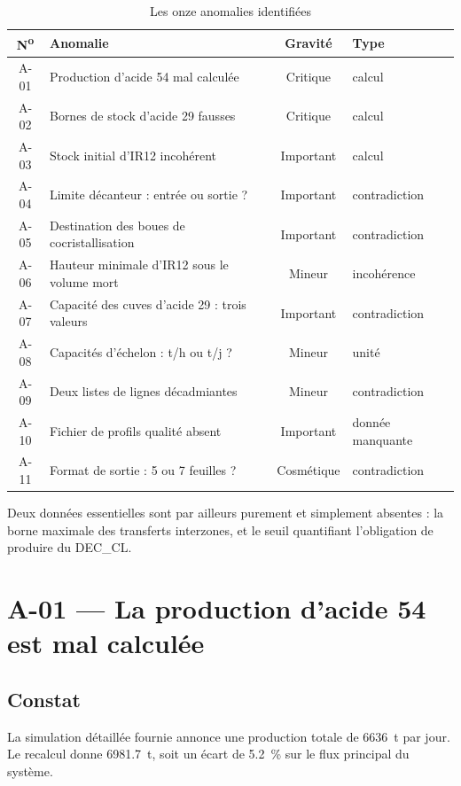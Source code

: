\begin{table}[H]
\centering
\caption{Les onze anomalies identifiées}
\label{tab:anomalies}
\begin{tabular}{@{}clcl@{}}
\toprule
\textbf{N\textsuperscript{o}} & \textbf{Anomalie} & \textbf{Gravité} & \textbf{Type} \\
\midrule
A-01 & Production d'acide 54 mal calculée & Critique & calcul \\
A-02 & Bornes de stock d'acide 29 fausses & Critique & calcul \\
A-03 & Stock initial d'IR12 incohérent & Important & calcul \\
A-04 & Limite décanteur : entrée ou sortie ? & Important & contradiction \\
A-05 & Destination des boues de cocristallisation & Important & contradiction \\
A-06 & Hauteur minimale d'IR12 sous le volume mort & Mineur & incohérence \\
A-07 & Capacité des cuves d'acide 29 : trois valeurs & Important & contradiction \\
A-08 & Capacités d'échelon : t/h ou t/j ? & Mineur & unité \\
A-09 & Deux listes de lignes décadmiantes & Mineur & contradiction \\
A-10 & Fichier de profils qualité absent & Important & donnée manquante \\
A-11 & Format de sortie : 5 ou 7 feuilles ? & Cosmétique & contradiction \\
\bottomrule
\end{tabular}
\end{table}

Deux données essentielles sont par ailleurs purement et simplement absentes : la borne
maximale des transferts interzones, et le seuil quantifiant l'obligation de produire du
DEC\_CL.

\section{A-01 --- La production d'acide 54 est mal calculée}

\subsection{Constat}

La simulation détaillée fournie annonce une production totale de \SI{6636}{\tonne} par jour.
Le recalcul donne \SI{6981,7}{\tonne}, soit un écart de \SI{5,2}{\percent} sur le flux
principal du système.

